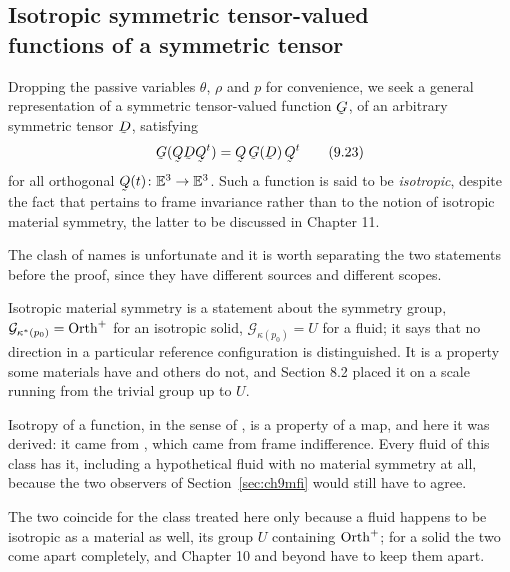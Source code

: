 \subsection[Isotropic symmetric tensor-valued functions of a symmetric
tensor]{Isotropic symmetric tensor-valued\\ functions of a symmetric
tensor}\label{sec:ch9isotropic}

Dropping the passive variables $\theta$, $\rho$ and $p$ for
convenience, we seek a general representation of a symmetric
tensor-valued function $\bG$, of an arbitrary symmetric tensor $\bD$,
satisfying
\begin{equation}
   \bG(\bQ\bD\bQ^{t})=\bQ\,\bG(\bD)\,\bQ^{t}
   \tag{9.23}\label{eq:9.23}
\end{equation}
for all orthogonal $\bQ(t)\colon\Et\to\Et$. Such a function is said to
be \emph{isotropic}, despite the fact that  pertains to frame
invariance rather than to the notion of isotropic material symmetry, the
latter to be discussed in Chapter 11.

\begin{remark}\label{rem:ch9twoisos}
The clash of names is unfortunate and it is worth separating the two
statements before the proof, since they have different sources and
different scopes.

Isotropic material symmetry is a statement about the symmetry group,
$\mathcal{G}_{\kappa^{*}(p_{0})}=\operatorname{Orth}^{+}$ for an isotropic solid,
$\mathcal{G}_{\kappa(p_{0})}=U$ for a fluid; it says that no direction
in a particular reference configuration is distinguished. It is a
property some materials have and others do not, and Section 8.2 placed
it on a scale running from the trivial group up to $U$.

Isotropy of a function, in the sense of , is a property of
a map, and here it was derived: it came from , which
came from frame indifference. Every fluid of this class has it,
including a hypothetical fluid with no material symmetry at all, because
the two observers of Section~\ref{sec:ch9mfi} would still have to agree.

The two coincide for the class treated here only because a fluid happens
to be isotropic as a material as well, its group $U$ containing
$\operatorname{Orth}^{+}$; for a solid the two come apart completely, and Chapter 10
and beyond have to keep them apart.
\end{remark}

